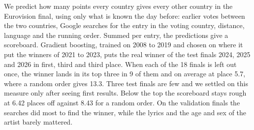 We predict how many points every country gives every other country in the Eurovision final, using only what is known the day before: earlier votes between the two countries, Google searches for the entry in the voting country, distance, language and the running order. Summed per entry, the predictions give a scoreboard. Gradient boosting, trained on 2008 to 2019 and chosen on where it put the winners of 2021 to 2023, puts the real winner of the test finals 2024, 2025 and 2026 in first, third and third place. When each of the 18 finals is left out once, the winner lands in its top three in 9 of them and on average at place 5.7, where a random order gives 13.3. Three test finals are few and we settled on this measure only after seeing first results. Below the top the scoreboard stays rough at 6.42 places off against 8.43 for a random order. On the validation finals the searches did most to find the winner, while the lyrics and the age and sex of the artist barely mattered.
